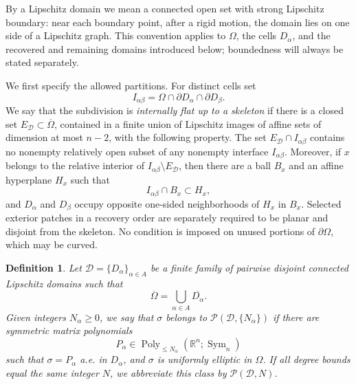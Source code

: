 \documentclass[10pt,a4paper]{amsart}
\newtheorem{definition}[theorem]{Definition}
\newcommand{\R}{\mathbb R}
\newcommand{\Sym}{\operatorname{Sym}}
\begin{document}
By a Lipschitz domain we mean a connected open set with strong Lipschitz
boundary: near each boundary point, after a rigid motion, the domain lies on
one side of a Lipschitz graph.  This convention applies to \(\Omega\), the
cells \(D_\alpha\), and the recovered and remaining domains introduced below;
boundedness will always be stated separately.

We first specify the allowed partitions.  For distinct cells set
\begin{equation}
  I_{\alpha\beta}
  =\Omega\cap\partial D_\alpha\cap\partial D_\beta .
  \label{eq:clipped-cell-interface}
\end{equation}
We say that the subdivision is \emph{internally flat up to a skeleton} if there
is a closed set \(E_{\mathcal D}\subset\overline\Omega\), contained in a finite
union of Lipschitz images of affine sets of dimension at most \(n-2\), with the
following property.  The set \(E_{\mathcal D}\cap I_{\alpha\beta}\) contains no
nonempty relatively open subset of any nonempty interface
\(I_{\alpha\beta}\).  Moreover, if \(x\) belongs to the relative interior of
\(I_{\alpha\beta}\setminus E_{\mathcal D}\), then there are a ball \(B_x\) and
an affine hyperplane \(H_x\) such that
\begin{equation}
  I_{\alpha\beta}\cap B_x\subset H_x,
\end{equation}
and \(D_\alpha\) and \(D_\beta\) occupy opposite one-sided neighborhoods of
\(H_x\) in \(B_x\).  Selected exterior patches in a recovery order are
separately required to be planar and disjoint from the skeleton.  No condition
is imposed on unused portions of \(\partial\Omega\), which may be curved.

\begin{definition}
\label{def:piecewise-poly-class}
Let \(\mathcal D=\{D_\alpha\}_{\alpha\in A}\) be a finite family of pairwise
disjoint connected Lipschitz domains such that
\begin{equation}
  \overline\Omega=\bigcup_{\alpha\in A}\overline{D_\alpha}.
\end{equation}
Given integers \(N_\alpha\ge0\), we say that \(\sigma\) belongs to
\(\mathcal P(\mathcal D,\{N_\alpha\})\) if there are symmetric matrix
polynomials
\begin{equation}
  P_\alpha\in \operatorname{Poly}_{\le N_\alpha}(\R^n;\Sym_n)
\end{equation}
such that \(\sigma=P_\alpha\) a.e. in \(D_\alpha\), and \(\sigma\) is uniformly
elliptic in \(\Omega\).
If all degree bounds equal the same integer \(N\), we abbreviate this class by
\(\mathcal P(\mathcal D,N)\).
\end{definition}
\end{document}
